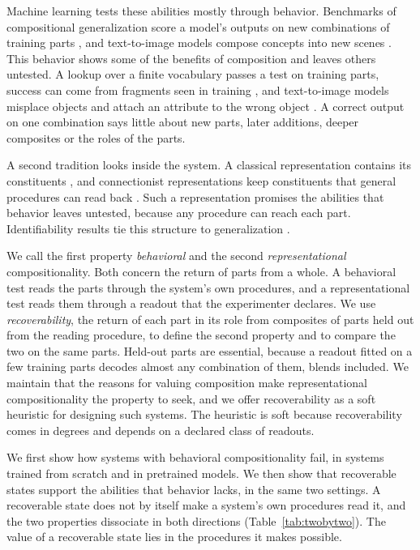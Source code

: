 \documentclass[10pt]{article}
\theoremstyle{plain}
\theoremstyle{remark}
\begin{document}
Machine learning tests these abilities mostly through behavior. Benchmarks of compositional generalization score a model's outputs on new combinations of training parts \citep{lake2018,keysers2020,kim2020cogs,hupkes2020}, and text-to-image models compose concepts into new scenes \citep{ramesh2021,okawa2023}. This behavior shows some of the benefits of composition and leaves others untested. A lookup over a finite vocabulary passes a test on training parts, success can come from fragments seen in training \citep{dziri2023}, and text-to-image models misplace objects \citep{conwell2022} and attach an attribute to the wrong object \citep{rassin2022}. A correct output on one combination says little about new parts, later additions, deeper composites or the roles of the parts.

A second tradition looks inside the system. A classical representation contains its constituents \citep{fodor1988}, and connectionist representations keep constituents that general procedures can read back \citep{smolensky1990,vangelder1990}. Such a representation promises the abilities that behavior leaves untested, because any procedure can reach each part. Identifiability results tie this structure to generalization \citep{lachapelle2023,wiedemer2024,uselis2026}.

We call the first property \emph{behavioral} and the second \emph{representational} compositionality. Both concern the return of parts from a whole. A behavioral test reads the parts through the system's own procedures, and a representational test reads them through a readout that the experimenter declares. We use \emph{recoverability}, the return of each part in its role from composites of parts held out from the reading procedure, to define the second property and to compare the two on the same parts. Held-out parts are essential, because a readout fitted on a few training parts decodes almost any combination of them, blends included. We maintain that the reasons for valuing composition make representational compositionality the property to seek, and we offer recoverability as a soft heuristic for designing such systems. The heuristic is soft because recoverability comes in degrees and depends on a declared class of readouts.

We first show how systems with behavioral compositionality fail, in systems trained from scratch and in pretrained models. We then show that recoverable states support the abilities that behavior lacks, in the same two settings. A recoverable state does not by itself make a system's own procedures read it, and the two properties dissociate in both directions (Table~\ref{tab:twobytwo}). The value of a recoverable state lies in the procedures it makes possible.
\end{document}
